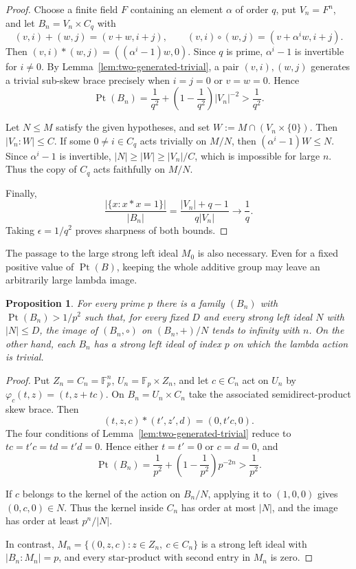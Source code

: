\documentclass[10pt,a4paper]{amsart}
\numberwithin{equation}{section}
\newtheorem{pro}[equation]{Proposition}
\newcommand{\Pt}{\operatorname{Pt} }
\begin{document}
\begin{proof}
Choose a finite field $F$ containing an element $\alpha$ of order $q$,
put $V_n=F^n$, and let $B_n=V_n\times C_q$ with
$$
(v,i)+(w,j)=(v+w,i+j),\qquad
(v,i)\circ(w,j)=(v+\alpha^iw,i+j).
$$
Then $(v,i)*(w,j)=((\alpha^i-1)w,0)$. Since $q$ is prime,
$\alpha^i-1$ is invertible for $i\neq0$. By
Lemma~\ref{lem:two-generated-trivial}, a pair
$(v,i),(w,j)$ generates a trivial sub-skew brace precisely when
$i=j=0$ or $v=w=0$. Hence
$$
\Pt(B_n)=\frac1{q^2}+
\left(1-\frac1{q^2}\right)|V_n|^{-2}>\frac1{q^2}.
$$

Let $N\leqslant M$ satisfy the given hypotheses, and set
$W :=M\cap(V_n\times\{0\})$. Then $|V_n:W|\leqslant C$. If some
$0\neq i\in C_q$ acts trivially on $M/N$, then
$(\alpha^i-1)W\leqslant N$. Since $\alpha^i-1$ is invertible,
$|N|\geqslant|W|\geqslant|V_n|/C$, which is impossible for large $n$.
Thus the copy of $C_q$ acts faithfully on $M/N$.

Finally,
$$
\frac{|\{x:x*x= 1\}|}{|B_n|}
=\frac{|V_n|+q-1}{q|V_n|}\longrightarrow\frac1q.
$$
Taking $\epsilon=1/q^2$ proves sharpness of both bounds.
\end{proof}

The passage to the large strong left ideal $M_0$ is also necessary.
Even for a fixed positive value of $\Pt(B)$, keeping the whole additive
group may leave an arbitrarily large lambda image.

\begin{pro} %
For every prime $p$ there is a family $(B_n)$ with
$\Pt(B_n)>1/p^2$ such that, for every fixed $D$ and every strong left
ideal $N$ with $|N|\leqslant D$, the image of
$(B_n,\circ)$ on $(B_n,+)/N$ tends to infinity with $n$. On the other
hand, each $B_n$ has a strong left ideal of index $p$ on which the
lambda action is trivial.
\end{pro}

\begin{proof}
Put $Z_n=C_n=\mathbb F_p^n$, $U_n=\mathbb F_p\times Z_n$, and let
$c\in C_n$ act on $U_n$ by
$\varphi_c(t,z)=(t,z+tc)$. On $B_n=U_n\times C_n$ take the associated
semidirect-product skew brace. Then
$$
(t,z,c)*(t',z',d)=(0,t'c,0).
$$
The four conditions of Lemma~\ref{lem:two-generated-trivial} reduce to
$tc=t'c=td=t'd=0$. Hence either $t=t'=0$ or $c=d=0$, and
$$
\Pt(B_n)=\frac1{p^2}+
\left(1-\frac1{p^2}\right)p^{-2n}>\frac1{p^2}.
$$

If $c$ belongs to the kernel of the action on $B_n/N$, applying it to
$(1,0,0)$ gives $(0,c,0)\in N$. Thus the kernel inside $C_n$ has order
at most $|N|$, and the image has order at least $p^n/|N|$.

In contrast,
$M_n=\{(0,z,c):z\in Z_n,\ c\in C_n\}$ is a strong left ideal with
$|B_n:M_n|=p$, and every star-product with second entry in $M_n$ is
zero.
\end{proof}
\end{document}
